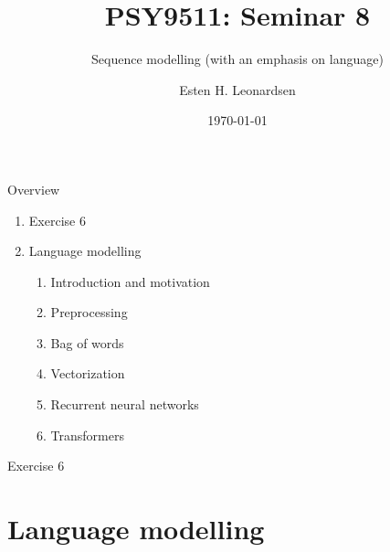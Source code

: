 \documentclass[10pt]{beamer}
\title{PSY9511: Seminar 8}
\subtitle{Sequence modelling (with an emphasis on language)}
\author{Esten H. Leonardsen}
\date{\today}
\begin{document}
	\begin{frame}
	 	\titlepage
	\end{frame}

    \begin{frame}{Overview}
        \begin{enumerate}
            \item Exercise 6
            \item Language modelling
            \begin{enumerate}
                \item Introduction and motivation
                \item Preprocessing
                \item Bag of words
                \item Vectorization
                \item Recurrent neural networks
                \item Transformers
            \end{enumerate}
        \end{enumerate}
    \end{frame}

    \begin{frame}{Exercise 6}
    \end{frame}

    \section{Language modelling}
\end{document}

